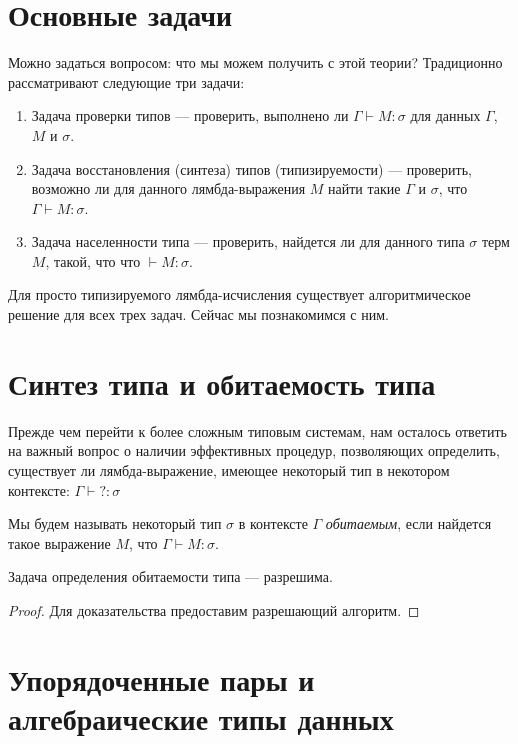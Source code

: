 \section{Основные задачи}

Можно задаться вопросом: что мы можем получить с этой теории?
Традиционно рассматривают следующие три задачи:

\begin{enumerate}
\item Задача проверки типов --- проверить, выполнено ли $\Gamma \vdash M:\sigma$ для
данных $\Gamma$, $M$ и $\sigma$.
\item Задача восстановления (синтеза) типов (типизируемости) --- проверить, возможно ли для
данного лямбда-выражения $M$ найти такие $\Gamma$ и $\sigma$, что $\Gamma \vdash M:\sigma$.
\item Задача населенности типа --- проверить, найдется ли для данного типа $\sigma$ терм $M$, такой, что
что $\vdash M:\sigma$.
\end{enumerate}

Для просто типизируемого лямбда-исчисления существует алгоритмическое решение для всех
трех задач. Сейчас мы познакомимся с ним.

\section{Синтез типа и обитаемость типа}

Прежде чем перейти к более сложным типовым системам, нам осталось ответить на важный
вопрос о наличии эффективных процедур, позволяющих определить, существует ли лямбда-выражение,
имеющее некоторый тип в некотором контексте: $\Gamma\vdash ?:\sigma$

\begin{definition}
Мы будем называть некоторый тип $\sigma$ в контексте $\Gamma$ \emph{обитаемым}, если 
найдется такое выражение $M$, что $\Gamma\vdash M:\sigma$.
\end{definition}

\begin{theorem}
Задача определения обитаемости типа --- разрешима.
\end{theorem}

\begin{proof}
Для доказательства предоставим разрешающий алгоритм.
\end{proof}

\section{Упорядоченные пары и алгебраические типы данных}

